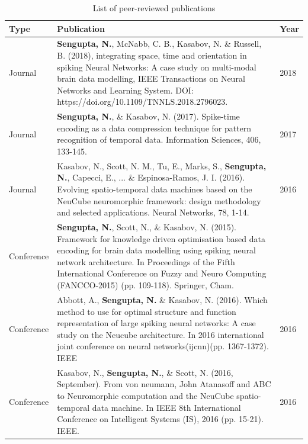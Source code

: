 \begin{table}
		\centering
		\caption{List of peer-reviewed publications}
		\label{tab:publications}
	\begin{tabular}{@{}p{2cm}p{12cm}p{1cm}@{}}
			\toprule\toprule
			Type & Publication & Year \\ \midrule
			
			Journal & \textbf{Sengupta, N.}, McNabb, C. B., Kasabov, N. \& Russell, B. (2018), integrating space, time and orientation in spiking Neural Networks: A case study on multi-modal brain data modelling, IEEE Transactions on Neural Networks and Learning System. DOI: https://doi.org/10.1109/TNNLS.2018.2796023. & 2018 \\ \midrule
			
			Journal & \textbf{Sengupta, N.}, \& Kasabov, N. (2017). Spike-time encoding as a data compression technique for pattern recognition of temporal data. Information Sciences,  406, 133-145. & 2017 \\ \midrule
			
			Journal & Kasabov, N., Scott, N. M., Tu, E., Marks, S., \textbf{Sengupta, N.}, Capecci, E., ... \& Espinosa-Ramos, J. I. (2016). Evolving spatio-temporal data machines based on the NeuCube neuromorphic framework: design methodology and selected applications. Neural Networks, 78, 1-14. & 2016 \\ \midrule

			Conference & \textbf{Sengupta, N.}, Scott, N., \& Kasabov, N. (2015). Framework for knowledge driven optimisation based data encoding for brain data modelling using spiking neural network architecture. In Proceedings of the Fifth International Conference on Fuzzy and Neuro Computing (FANCCO-2015) (pp. 109-118). Springer, Cham. \\ \midrule
			
			Conference & Abbott, A., \textbf{Sengupta, N.} \& Kasabov, N. (2016). Which method to use for optimal structure and function representation of large spiking neural networks: A case study on the Neucube architecture. In 2016 international joint conference on neural networks(ijcnn)(pp. 1367-1372). IEEE & 2016 \\ \midrule
			
			Conference & Kasabov, N., \textbf{Sengupta, N.}, \& Scott, N. (2016, September). From von neumann, John Atanasoff and ABC to Neuromorphic computation and the NeuCube spatio-temporal data machine. In IEEE 8th International Conference on Intelligent Systems (IS), 2016  (pp. 15-21). IEEE. & 2016 \\ \midrule
			

\end{tabular}
\end{table}
